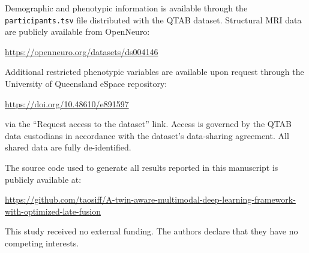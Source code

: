 \documentclass[10pt,letterpaper]{article}
\begin{document}
Demographic and phenotypic information is available through the \texttt{participants.tsv} file distributed with the QTAB dataset. Structural MRI data are publicly available from OpenNeuro:

\begin{center}
\url{https://openneuro.org/datasets/ds004146}
\end{center}

Additional restricted phenotypic variables are available upon request through the University of Queensland eSpace repository:

\begin{center}
\url{https://doi.org/10.48610/e891597}
\end{center}

via the ``Request access to the dataset'' link. Access is governed by the QTAB data custodians in accordance with the dataset's data-sharing agreement. All shared data are fully de-identified.

The source code used to generate all results reported in this manuscript is publicly available at:

\noindent\sloppy\url{https://github.com/taosiff/A-twin-aware-multimodal-deep-learning-framework-with-optimized-late-fusion}\fussy

This study received no external funding. The authors declare that they have no competing interests.
\end{document}
